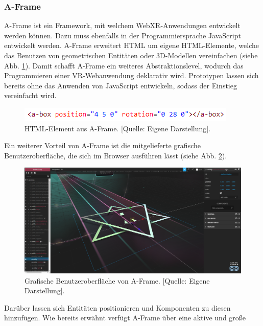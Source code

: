 \documentclass[a4paper,12pt,oneside]{article}
\begin{document}
      \subsubsection{A-Frame}
        A-Frame ist ein Framework, mit welchem WebXR-Anwendungen
        entwickelt werden können. Dazu muss ebenfalls in der Programmiersprache 
        JavaScript entwickelt werden. A-Frame erweitert HTML um eigene 
        HTML-Elemente, welche das Benutzen von geometrischen Entitäten oder 3D-Modellen
        vereinfachen (siehe Abb. \ref{fig:aframe1}). Damit schafft A-Frame ein 
        weiteres Abstraktionslevel, wodurch das Programmieren einer VR-Webanwendung
        deklarativ wird. Prototypen lassen sich bereits ohne das Anwenden von 
        JavaScript entwickeln, sodass der Einstieg vereinfacht wird.
        \begin{figure}[h]
          \centering
          \includegraphics{img/aframe1.png}
          \caption[HTML-Element aus A-Frame.]{HTML-Element aus A-Frame. [Quelle: Eigene Darstellung].}
          \label{fig:aframe1}
        \end{figure}
        Ein weiterer Vorteil von A-Frame ist die mitgelieferte grafische 
        Benutzeroberfläche, die sich im Browser ausführen lässt 
        (siehe Abb. \ref{fig:aframe1-gui}).
        \begin{figure}[h]
          \centering
          \includegraphics[scale=0.3]{img/aframe-editor.png}
          \caption[Grafische Benutzeroberfläche von A-Frame.]{Grafische Benutzeroberfläche von A-Frame. [Quelle: Eigene Darstellung].}
          \label{fig:aframe1-gui}
        \end{figure}
        Darüber lassen sich Entitäten positionieren und Komponenten zu diesen 
        hinzufügen. Wie bereits erwähnt verfügt A-Frame über eine aktive und große
\end{document}
